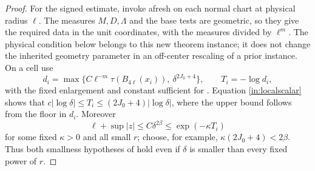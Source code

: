 \begin{proof}
For the signed estimate, invoke  afresh on each normal
chart at physical radius $\ell$.  The measures $M,D,\Lambda$ and the
base tests are geometric, so they give the required data in the unit
coordinates, with the measures divided by $\ell^m$.  The physical
condition below belongs to this new theorem instance; it does not change
the inherited geometry parameter in an off-center rescaling of a prior
instance.  On a cell use
\[
 d_i=\max\{C\ell^{-m}\tau(B_{4\ell}(x_i)),\ \delta^{2J_0+4}\},
 \qquad T_i=-\log d_i,
\]
with the fixed enlargement and constant sufficient for
.  Equation \eqref{in:localscalar} shows that
$c|\log\delta|\leq T_i\leq(2J_0+4)|\log\delta|$, where the upper
bound follows from the floor in $d_i$.  Moreover
\[
 \ell+\sup|z|\leq C\delta^{2\beta}
                       \leq \exp(-\kappa T_i)
\]
for some fixed $\kappa>0$ and all small $r$; choose, for example,
$\kappa(2J_0+4)<2\beta$.  Thus both smallness hypotheses of
 hold even if $\delta$ is smaller than every fixed
power of $r$.


\end{proof}
